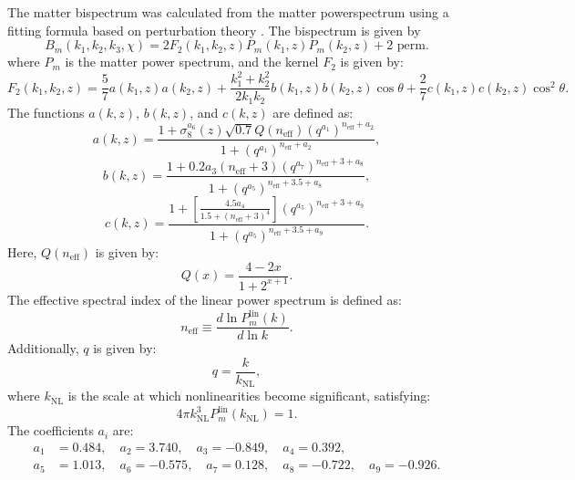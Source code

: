 \documentclass[11pt]{article} %
\begin{document}
The matter bispectrum was calculated from the matter powerspectrum using a fitting formula based on perturbation theory \cite{bispfit}. The bispectrum is given by
\begin{equation}
    B_m(k_1, k_2, k_3, \chi) = 2 F_2(k_1, k_2, z) P_m(k_1, z) P_m(k_2, z) + \text{2 perm.}
\end{equation}
where \( P_m \) is the matter power spectrum, and the kernel \( F_2 \) is given by:
\begin{equation}
    F_2(k_1, k_2, z) = \frac{5}{7} a(k_1, z) a(k_2, z) + \frac{k_1^2 + k_2^2}{2 k_1 k_2} b(k_1, z) b(k_2, z) \cos \theta + \frac{2}{7} c(k_1, z) c(k_2, z) \cos^2 \theta.
\end{equation}
The functions \( a(k, z) \), \( b(k, z) \), and \( c(k, z) \) are defined as:
\begin{equation}
    a(k, z) = \frac{1 + \sigma_8^{a_6}(z) \sqrt{0.7} Q(n_{\text{eff}}) (q^{a_1})^{n_{\text{eff}} + a_2}}{1 + (q^{a_1})^{n_{\text{eff}} + a_2}},
\end{equation}
\begin{equation}
    b(k, z) = \frac{1 + 0.2 a_3 (n_{\text{eff}} + 3) (q^{a_7})^{n_{\text{eff}} + 3 + a_8}}{1 + (q^{a_5})^{n_{\text{eff}} + 3.5 + a_8}},
\end{equation}
\begin{equation}
    c(k, z) = \frac{1 + \left[ \frac{4.5 a_4}{1.5 + (n_{\text{eff}} + 3)^4} \right] (q^{a_5})^{n_{\text{eff}} + 3 + a_9}}{1 + (q^{a_5})^{n_{\text{eff}} + 3.5 + a_9}}.
\end{equation}
Here, \( Q(n_{\text{eff}}) \) is given by:
\begin{equation}
    Q(x) = \frac{4 - 2x}{1 + 2^{x+1}}.
\end{equation}
The effective spectral index of the linear power spectrum is defined as:
\begin{equation}
    n_{\text{eff}} \equiv \frac{d \ln P_m^{\text{lin}}(k)}{d \ln k}.
\end{equation}
Additionally, \( q \) is given by:
\begin{equation}
    q = \frac{k}{k_{\text{NL}}},
\end{equation}
where \( k_{\text{NL}} \) is the scale at which nonlinearities become significant, satisfying:
\begin{equation}
    4 \pi k_{\text{NL}}^3 P_m^{\text{lin}}(k_{\text{NL}}) = 1.
\end{equation}
The coefficients \( a_i \) are:
\begin{align*}
    a_1 &= 0.484, \quad a_2 = 3.740, \quad a_3 = -0.849, \quad a_4 = 0.392, \\
    a_5 &= 1.013, \quad a_6 = -0.575, \quad a_7 = 0.128, \quad a_8 = -0.722, \quad a_9 = -0.926.
\end{align*}
\end{document}
